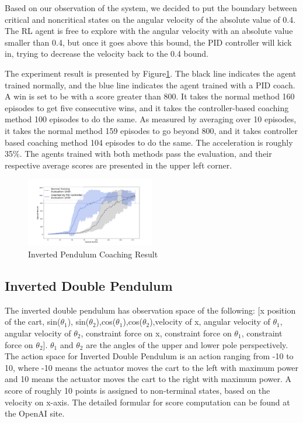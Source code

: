 \documentclass[journal]{IEEEtran}
\begin{document}
Based on our observation of the system, we decided to put the boundary between critical and noncritical states on the angular velocity of the absolute value of 0.4. The RL agent is free to explore with the angular velocity with an absolute value smaller than 0.4, but once it goes above this bound, the PID controller will kick in, trying to decrease the velocity back to the 0.4 bound.

The experiment result is presented by Figure\ref{fig:ip_result}. The black line indicates the agent trained normally, and the blue line indicates the agent trained with a PID coach. A win is set to be with a score greater than 800. It takes the normal method 160 episodes to get five consecutive wins, and it takes the controller-based coaching method 100 episodes to do the same. As measured by averaging over 10 episodes, it takes the normal method 159 episodes to go beyond 800, and it takes controller based coaching method 104 episodes to do the same. The acceleration is roughly 35\%. The agents trained with both methods pass the evaluation, and their respective average scores are presented in the upper left corner.

\begin{figure}
     \centering
      \includegraphics[width=0.5\textwidth]{ip.png}
      \caption{Inverted Pendulum Coaching Result}
      \label{fig:ip_result}

\end{figure}

\subsection{Inverted Double Pendulum}
The inverted double pendulum has observation space of the following: [x position of the cart, sin($\theta_1$), sin($\theta_2$),cos($\theta_1$),cos($\theta_2$),velocity of x, angular velocity of $\theta_1$, angular velocity of $\theta_2$, constraint force on x, constraint force on $\theta_1$, constraint force on $\theta_2$]. $\theta_1$ and $\theta_2$ are the angles of the upper and lower pole perspectively. The action space for Inverted Double Pendulum is an action ranging from -10 to 10, where -10 means the actuator moves the cart to the left with maximum power and 10 means the actuator moves the cart to the right with maximum power. A score of roughly 10 points is assigned to non-terminal states, based on the velocity on x-axis. The detailed formular for score computation can be found at the OpenAI site.
\end{document}
